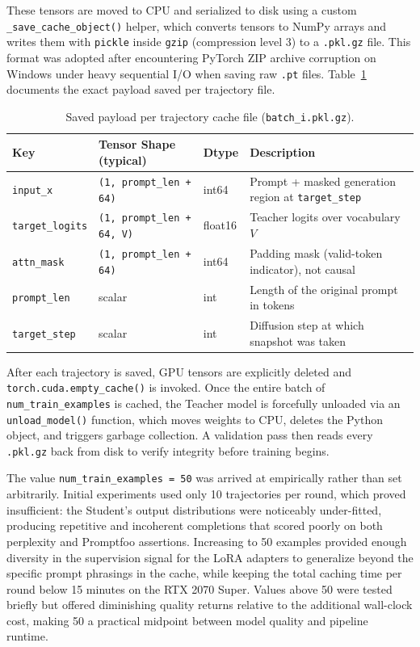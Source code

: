 \documentclass[11pt, a4paper]{article}
\begin{document}
These tensors are moved to CPU and serialized to disk using a custom \texttt{\_save\_cache\_object()} helper, which converts tensors to NumPy arrays and writes them with \texttt{pickle} inside \texttt{gzip} (compression level 3) to a \texttt{.pkl.gz} file. This format was adopted after encountering PyTorch ZIP archive corruption on Windows under heavy sequential I/O when saving raw \texttt{.pt} files. Table~\ref{tab:cache_payload} documents the exact payload saved per trajectory file.

\begin{table}[H]
\centering
\caption{Saved payload per trajectory cache file (\texttt{batch\_i.pkl.gz}).}
\label{tab:cache_payload}
\begin{tabularx}{\textwidth}{@{}lXlX@{}}
\toprule
\textbf{Key} & \textbf{Tensor Shape (typical)} & \textbf{Dtype} & \textbf{Description} \\ \midrule
\texttt{input\_x}       & \texttt{(1, prompt\_len + 64)}    & int64   & Prompt + masked generation region at \texttt{target\_step} \\
\texttt{target\_logits} & \texttt{(1, prompt\_len + 64, V)} & float16 & Teacher logits over vocabulary $V$ \\
\texttt{attn\_mask}     & \texttt{(1, prompt\_len + 64)}    & int64   & Padding mask (valid-token indicator), not causal \\
\texttt{prompt\_len}    & scalar                            & int     & Length of the original prompt in tokens \\
\texttt{target\_step}   & scalar                            & int     & Diffusion step at which snapshot was taken \\ \bottomrule
\end{tabularx}
\end{table}

After each trajectory is saved, GPU tensors are explicitly deleted and \texttt{\small torch.cuda.empty\_cache()} is invoked. Once the entire batch of \texttt{num\_train\_examples} is cached, the Teacher model is forcefully unloaded via an \texttt{unload\_model()} function, which moves weights to CPU, deletes the Python object, and triggers garbage collection. A validation pass then reads every \texttt{.pkl.gz} back from disk to verify integrity before training begins.

The value \texttt{num\_train\_examples = 50} was arrived at empirically rather than set arbitrarily. Initial experiments used only 10 trajectories per round, which proved insufficient: the Student's output distributions were noticeably under-fitted, producing repetitive and incoherent completions that scored poorly on both perplexity and Promptfoo assertions. Increasing to 50 examples provided enough diversity in the supervision signal for the LoRA adapters to generalize beyond the specific prompt phrasings in the cache, while keeping the total caching time per round below 15 minutes on the RTX 2070 Super. Values above 50 were tested briefly but offered diminishing quality returns relative to the additional wall-clock cost, making 50 a practical midpoint between model quality and pipeline runtime.
\end{document}
